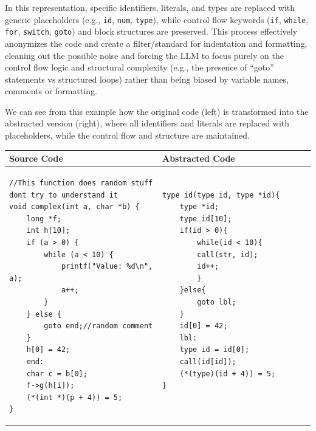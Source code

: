 In this representation, specific identifiers, literals, and types are replaced with generic placeholders (e.g., \texttt{id}, \texttt{num}, \texttt{type}), while control flow keywords (\texttt{if}, \texttt{while}, \texttt{for}, \texttt{switch}, \texttt{goto}) and block structures are preserved.
This process effectively anonymizes the code and create a filter/standard for indentation and formatting, cleaning out the possible noise and forcing the \ac{LLM} to focus purely on the control flow logic and structural complexity (e.g., the presence of ``goto'' statements vs structured loops)
rather than being biased by variable names, comments or formatting.

We can see from this example how the original code (left) is transformed into the abstracted version (right), where all identifiers and literals are replaced with placeholders, while the control flow and structure are maintained.

\begin{longtable}{|p{0.50\linewidth}|p{0.50\linewidth}|}
    \hline
    \textbf{Source Code} & \textbf{Abstracted Code} \\ 
    \hline
    \endhead
    \begin{minipage}[t]{\linewidth}
       
        \begin{lstlisting}[style=CStyle]
//This function does random stuff dont try to understand it
void complex(int a, char *b) {
    long *f;
    int h[10];
    if (a > 0) {
        while (a < 10) {
            printf("Value: %d\n", a);
            a++;
        }  
    } else {
        goto end;//random comment
    }
    h[0] = 42;
    end:    
    char c = b[0];
    f->g(h[i]);
    (*(int *)(p + 4)) = 5;
}   
        \end{lstlisting}
        
    \end{minipage} 
    & 
    \begin{minipage}[t]{\linewidth}

        \begin{lstlisting}[style=CStyle]
type id(type id, type *id){
    type *id;
    type id[10];
    if(id > 0){
        while(id < 10){
        call(str, id);
        id++;
        }
    }else{
        goto lbl;
    }
    id[0] = 42;
    lbl:
    type id = id[0];
    call(id[id]);
    (*(type)(id + 4)) = 5;
}


        \end{lstlisting}
    \end{minipage} 
    \\ \hline
\end{longtable}

